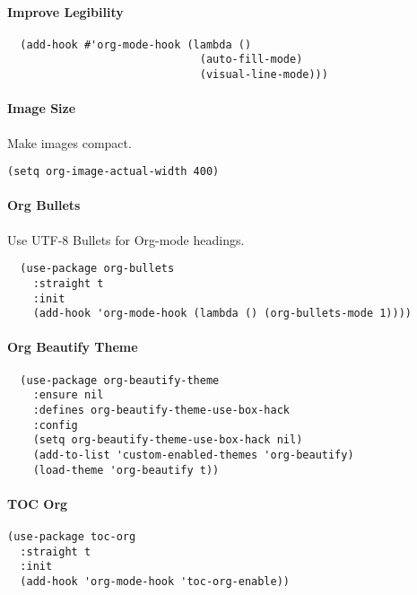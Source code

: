 \documentclass[11pt]{article}
\begin{document}
\paragraph*{Improve Legibility}
\label{sec:orgb943234}

\begin{verbatim}
  (add-hook #'org-mode-hook (lambda ()
                              (auto-fill-mode)
                              (visual-line-mode)))
\end{verbatim}

\paragraph*{Image Size}
\label{sec:org5534c0c}

Make images compact.

\begin{verbatim}
(setq org-image-actual-width 400)
\end{verbatim}

\paragraph*{Org Bullets}
\label{sec:orgcc217a5}

Use UTF-8 Bullets for Org-mode headings.

\begin{verbatim}
  (use-package org-bullets
    :straight t
    :init
    (add-hook 'org-mode-hook (lambda () (org-bullets-mode 1))))

\end{verbatim}

\paragraph*{Org Beautify Theme}
\label{org-beautify-theme}
\begin{verbatim}
  (use-package org-beautify-theme
    :ensure nil
    :defines org-beautify-theme-use-box-hack
    :config
    (setq org-beautify-theme-use-box-hack nil)
    (add-to-list 'custom-enabled-themes 'org-beautify)
    (load-theme 'org-beautify t))
\end{verbatim}

\paragraph*{TOC Org}
\label{sec:org30e8b94}

\begin{verbatim}
(use-package toc-org
  :straight t
  :init
  (add-hook 'org-mode-hook 'toc-org-enable))
\end{verbatim}
\end{document}
